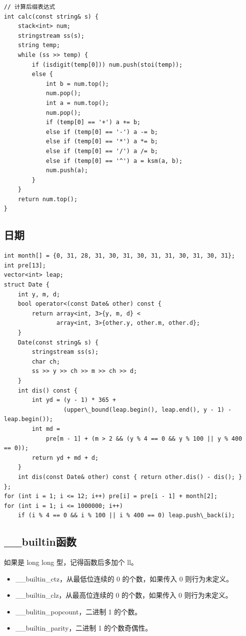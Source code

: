 \documentclass[UTF8]{ctexart}
\begin{document}
\begin{sloppypar}
\begin{lstlisting}[style=cpp]
// 计算后缀表达式
int calc(const string& s) {
    stack<int> num;
    stringstream ss(s);
    string temp;
    while (ss >> temp) {
        if (isdigit(temp[0])) num.push(stoi(temp));
        else {
            int b = num.top();
            num.pop();
            int a = num.top();
            num.pop();
            if (temp[0] == '+') a += b;
            else if (temp[0] == '-') a -= b;
            else if (temp[0] == '*') a *= b;
            else if (temp[0] == '/') a /= b;
            else if (temp[0] == '^') a = ksm(a, b);
            num.push(a);
        }
    }
    return num.top();
}
\end{lstlisting}

\subsection{日期}

\begin{lstlisting}[style=cpp]
int month[] = {0, 31, 28, 31, 30, 31, 30, 31, 31, 30, 31, 30, 31};
int pre[13];
vector<int> leap;
struct Date {
    int y, m, d;
    bool operator<(const Date& other) const {
        return array<int, 3>{y, m, d} <
               array<int, 3>{other.y, other.m, other.d};
    }
    Date(const string& s) {
        stringstream ss(s);
        char ch;
        ss >> y >> ch >> m >> ch >> d;
    }
    int dis() const {
        int yd = (y - 1) * 365 +
                 (upper\_bound(leap.begin(), leap.end(), y - 1) - leap.begin());
        int md =
            pre[m - 1] + (m > 2 && (y % 4 == 0 && y % 100 || y % 400 == 0));
        return yd + md + d;
    }
    int dis(const Date& other) const { return other.dis() - dis(); }
};
for (int i = 1; i <= 12; i++) pre[i] = pre[i - 1] + month[2];
for (int i = 1; i <= 1000000; i++)
    if (i % 4 == 0 && i % 100 || i % 400 == 0) leap.push\_back(i);
\end{lstlisting}

\subsection{\_\_builtin函数}

如果是 long long 型，记得函数后多加个 ll。

\begin{itemize}
   \item \_\_builtin\_ctz，从最低位连续的 0 的个数，如果传入 0 则行为未定义。
   \item \_\_builtin\_clz，从最高位连续的 0 的个数，如果传入 0 则行为未定义。
   \item \_\_bulitin\_popcount，二进制 1 的个数。
   \item \_\_builtin\_parity，二进制 1 的个数奇偶性。 
\end{itemize}


\end{sloppypar}
\end{document}
